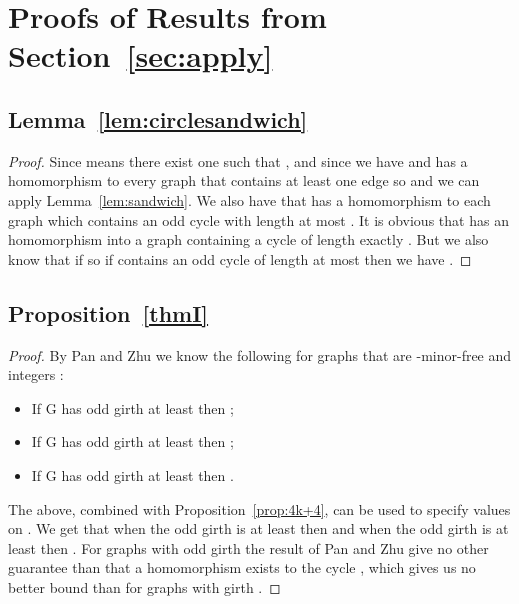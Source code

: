 \documentclass[11pt,a4paper]{article}
\begin{document}
\section{Proofs of Results from Section~\ref{sec:apply}}

\subsection*{Lemma~\ref{lem:circlesandwich}}
\begin{proof}
Since  means there exist one  such that , and since  we have  and  has a homomorphism to every graph that contains at least one edge so  and we can apply Lemma~\ref{lem:sandwich}. We also have that  has a homomorphism to each graph which contains an odd cycle with length at most . It is obvious that  has an homomorphism into a graph containing a cycle of length exactly . But we also know that  if  so if  contains an odd cycle of length at most  then we have . 
\end{proof}

\subsection*{Proposition~\ref{thmI}}
\begin{proof}
By Pan and Zhu we know the following for graphs  that are
-minor-free and integers :
\begin{itemize}
\item If G has odd girth at least  then ;
\item If G has odd girth at least  then ;
\item If G has odd girth at least  then .
\end{itemize}
The above, combined with Proposition~\ref{prop:4k+4}, can be used to
specify values on . We get that when the odd girth is at least
 then  and when the odd girth is at
least  then . For graphs with odd
girth  the result of Pan and Zhu give no other guarantee than that
a homomorphism exists to the cycle , which gives us no better
bound than for graphs with girth .
\end{proof}
\end{document}
